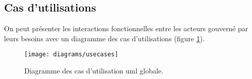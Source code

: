 \subsection{Cas d'utilisations}

On peut présenter les interactions fonctionnelles entre les acteurs gouverné par leurs besoins avec un diagramme des cas d'utilisations (figure \ref{fig:uml_usecase}).

\begin{figure}
\center
\texttt{[image: diagrams/usecases]}
\caption{Diagramme des cas d'utilisation \gls{uml} globale.}
\label{fig:uml_usecase}
\end{figure}